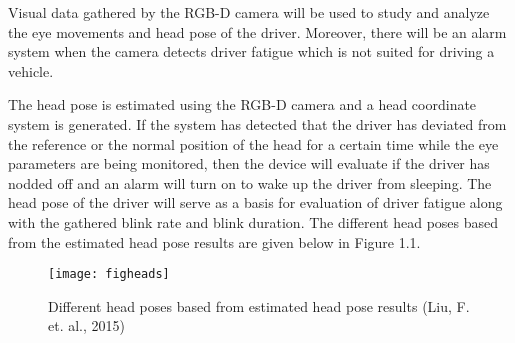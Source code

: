 Visual data gathered by the RGB-D camera will be used to study and analyze the eye movements and head pose of the driver. Moreover, there will be an alarm system when the camera detects driver fatigue which is not suited for driving a vehicle. 

The head pose is estimated using the RGB-D camera and a head coordinate system is generated. If the system has detected that the driver has deviated from the reference or the normal position of the head for a certain time while the eye parameters are being monitored, then the device will evaluate if the driver has nodded off and an alarm will turn on to wake up the driver from sleeping. The head pose of the driver will serve as a basis for evaluation of driver fatigue along with the gathered blink rate and blink duration. The different head poses based from the estimated head pose results are given below in Figure 1.1.
\newline

\begin{figure}[ht]
	\centering
	\texttt{[image: figheads]}
	\caption{Different head poses based from estimated head pose results (Liu, F. et. al., 2015)}
\end{figure}


